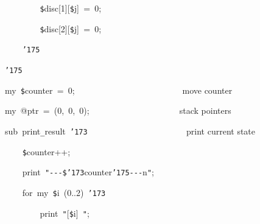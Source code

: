 \documentclass[a4paper,10pt]{article}
\def\mc{\relax}
\begin{document}
\noindent
\mbox{}{\tt\mc \ }{\tt\mc \ }{\tt\mc \ }{\tt\mc \ }{\tt\mc \ }{\tt\mc \ }{\tt\mc \ }{\tt\mc \ }{\tt\$}disc[1][{\tt\$}j]{\tt\mc \ }={\tt\mc \ }0;

\noindent
\mbox{}{\tt\mc \ }{\tt\mc \ }{\tt\mc \ }{\tt\mc \ }{\tt\mc \ }{\tt\mc \ }{\tt\mc \ }{\tt\mc \ }{\tt\$}disc[2][{\tt\$}j]{\tt\mc \ }={\tt\mc \ }0;

\noindent
\mbox{}{\tt\mc \ }{\tt\mc \ }{\tt\mc \ }{\tt\mc \ }{\tt\char'175}

\noindent
\mbox{}{\tt\char'175}

\noindent
\mbox{}\hfill

\noindent
\mbox{}my{\tt\mc \ }{\tt\$}counter{\tt\mc \ }={\tt\mc \ }0;{\tt\mc \ }{\tt\mc \ }{\tt\mc \ }{\tt\mc \ }{\tt\mc \ }{\tt\mc \ }{\tt\mc \ }{\tt\mc \ }{\tt\mc \ }{\tt\mc \ }{\tt\mc \ }{\tt\mc \ }{\tt\mc \ }{\tt\mc \ }{\tt\mc \ }{\tt\mc \ }{\tt\mc \ }{\tt\mc \ }{\tt\mc \ }{\tt\mc \ }{\tt\mc \ }{\tt\mc \ }{\tt\mc \ }{\tt\mc \ }\rm\mc {\tt\#} move counter
\tt\mc 

\noindent
\mbox{}my{\tt\mc \ }@ptr{\tt\mc \ }={\tt\mc \ }(0,{\tt\mc \ }0,{\tt\mc \ }0);{\tt\mc \ }{\tt\mc \ }{\tt\mc \ }{\tt\mc \ }{\tt\mc \ }{\tt\mc \ }{\tt\mc \ }{\tt\mc \ }{\tt\mc \ }{\tt\mc \ }{\tt\mc \ }{\tt\mc \ }{\tt\mc \ }{\tt\mc \ }{\tt\mc \ }{\tt\mc \ }{\tt\mc \ }{\tt\mc \ }{\tt\mc \ }{\tt\mc \ }\rm\mc {\tt\#} stack pointers
\tt\mc 

\noindent
\mbox{}\hfill

\noindent
\mbox{}sub{\tt\mc \ }print{\tt\_}result{\tt\mc \ }{\tt\char'173}{\tt\mc \ }{\tt\mc \ }{\tt\mc \ }{\tt\mc \ }{\tt\mc \ }{\tt\mc \ }{\tt\mc \ }{\tt\mc \ }{\tt\mc \ }{\tt\mc \ }{\tt\mc \ }{\tt\mc \ }{\tt\mc \ }{\tt\mc \ }{\tt\mc \ }{\tt\mc \ }{\tt\mc \ }{\tt\mc \ }{\tt\mc \ }{\tt\mc \ }{\tt\mc \ }{\tt\mc \ }\rm\mc {\tt\#} print current state
\tt\mc 

\noindent
\mbox{}{\tt\mc \ }{\tt\mc \ }{\tt\mc \ }{\tt\mc \ }{\tt\$}counter++;

\noindent
\mbox{}{\tt\mc \ }{\tt\mc \ }{\tt\mc \ }{\tt\mc \ }print{\tt\mc \ }{\tt "}{\tt -}{\tt -}{\tt -}{\tt\$}{\tt\char'173}counter{\tt\char'175}{\tt -}{\tt -}{\tt -}{\tt{}}n{\tt "};

\noindent
\mbox{}{\tt\mc \ }{\tt\mc \ }{\tt\mc \ }{\tt\mc \ }for{\tt\mc \ }my{\tt\mc \ }{\tt\$}i{\tt\mc \ }(0..2){\tt\mc \ }{\tt\char'173}

\noindent
\mbox{}{\tt\mc \ }{\tt\mc \ }{\tt\mc \ }{\tt\mc \ }{\tt\mc \ }{\tt\mc \ }{\tt\mc \ }{\tt\mc \ }print{\tt\mc \ }{\tt "}[{\tt\$}i]{\tt\mc \ }{\tt "};
\end{document}
